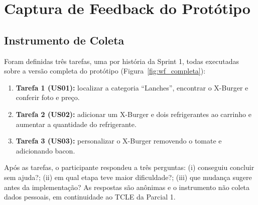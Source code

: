 \documentclass[12pt, oneside, a4paper, chapter=TITLE,section=TITLE]{abntex2}
\begin{document}
\begin{table}[ht]
\centering
\caption{Especificação sumária dos casos de uso da Sprint 1.}
\end{table}

\chapter{Captura de Feedback do Protótipo}

\section{Instrumento de Coleta}

Foram definidas três tarefas, uma por história da Sprint 1, todas executadas sobre a versão completa do protótipo (Figura~\ref{fig:wf_completa}):

\begin{enumerate}
  \item \textbf{Tarefa 1 (US01):} localizar a categoria ``Lanches'', encontrar o X-Burger e conferir foto e preço.
  \item \textbf{Tarefa 2 (US02):} adicionar um X-Burger e dois refrigerantes ao carrinho e aumentar a quantidade do refrigerante.
  \item \textbf{Tarefa 3 (US03):} personalizar o X-Burger removendo o tomate e adicionando bacon.
\end{enumerate}

Após as tarefas, o participante respondeu a três perguntas: (i) conseguiu concluir sem ajuda?; (ii) em qual etapa teve maior dificuldade?; (iii) que mudança sugere antes da implementação? As respostas são anônimas e o instrumento não coleta dados pessoais, em continuidade ao TCLE da Parcial 1.
\end{document}
